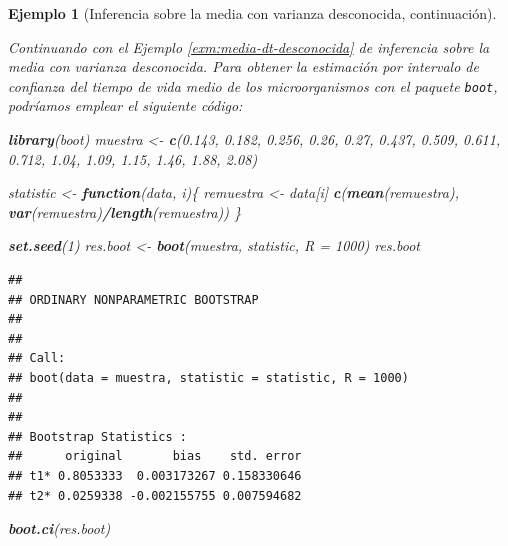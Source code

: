 \documentclass[
]{book}
\newenvironment{Shaded}{\begin{snugshade}}{\end{snugshade}}
\newcommand{\AttributeTok}[1]{\textcolor[rgb]{0.13,0.29,0.53}{#1}}
\newcommand{\ControlFlowTok}[1]{\textcolor[rgb]{0.13,0.29,0.53}{\textbf{#1}}}
\newcommand{\DecValTok}[1]{\textcolor[rgb]{0.00,0.00,0.81}{#1}}
\newcommand{\FloatTok}[1]{\textcolor[rgb]{0.00,0.00,0.81}{#1}}
\newcommand{\FunctionTok}[1]{\textcolor[rgb]{0.13,0.29,0.53}{\textbf{#1}}}
\newcommand{\NormalTok}[1]{#1}
\newcommand{\OtherTok}[1]{\textcolor[rgb]{0.56,0.35,0.01}{#1}}
\newcommand{\SpecialCharTok}[1]{\textcolor[rgb]{0.81,0.36,0.00}{\textbf{#1}}}
\theoremstyle{break}
\newtheorem{example}{Ejemplo}[chapter]
\theoremstyle{nonumberplain}
\begin{document}
\begin{example}[Inferencia sobre la media con varianza desconocida, continuación]
\protect\hypertarget{exm:media-dt-desconocida-boot}{}\label{exm:media-dt-desconocida-boot} \vspace{0.5cm}

Continuando con el Ejemplo \ref{exm:media-dt-desconocida} de
inferencia sobre la media con varianza desconocida.
Para obtener la estimación por intervalo de confianza del tiempo de vida medio
de los microorganismos con el paquete \texttt{boot}, podríamos emplear
el siguiente código:

\begin{Shaded}
\begin{Highlighting}[]
\FunctionTok{library}\NormalTok{(boot)}
\NormalTok{muestra }\OtherTok{\textless{}{-}} \FunctionTok{c}\NormalTok{(}\FloatTok{0.143}\NormalTok{, }\FloatTok{0.182}\NormalTok{, }\FloatTok{0.256}\NormalTok{, }\FloatTok{0.26}\NormalTok{, }\FloatTok{0.27}\NormalTok{, }\FloatTok{0.437}\NormalTok{, }\FloatTok{0.509}\NormalTok{, }
             \FloatTok{0.611}\NormalTok{, }\FloatTok{0.712}\NormalTok{, }\FloatTok{1.04}\NormalTok{, }\FloatTok{1.09}\NormalTok{, }\FloatTok{1.15}\NormalTok{, }\FloatTok{1.46}\NormalTok{, }\FloatTok{1.88}\NormalTok{, }\FloatTok{2.08}\NormalTok{)}

\NormalTok{statistic }\OtherTok{\textless{}{-}} \ControlFlowTok{function}\NormalTok{(data, i)\{}
\NormalTok{  remuestra }\OtherTok{\textless{}{-}}\NormalTok{ data[i]}
  \FunctionTok{c}\NormalTok{(}\FunctionTok{mean}\NormalTok{(remuestra), }\FunctionTok{var}\NormalTok{(remuestra)}\SpecialCharTok{/}\FunctionTok{length}\NormalTok{(remuestra))}
\NormalTok{\}}

\FunctionTok{set.seed}\NormalTok{(}\DecValTok{1}\NormalTok{)}
\NormalTok{res.boot }\OtherTok{\textless{}{-}} \FunctionTok{boot}\NormalTok{(muestra, statistic, }\AttributeTok{R =} \DecValTok{1000}\NormalTok{)}
\NormalTok{res.boot}
\end{Highlighting}
\end{Shaded}

\begin{verbatim}
## 
## ORDINARY NONPARAMETRIC BOOTSTRAP
## 
## 
## Call:
## boot(data = muestra, statistic = statistic, R = 1000)
## 
## 
## Bootstrap Statistics :
##      original       bias    std. error
## t1* 0.8053333  0.003173267 0.158330646
## t2* 0.0259338 -0.002155755 0.007594682
\end{verbatim}

\begin{Shaded}
\begin{Highlighting}[]
\FunctionTok{boot.ci}\NormalTok{(res.boot)}
\end{Highlighting}
\end{Shaded}


\end{example}
\end{document}
